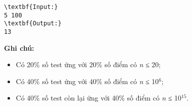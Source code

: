 \begin{verbatim}
\textbf{Input:}
5 100
\textbf{Output:}
13
\end{verbatim}

\textbf{\textbf{Ghi chú:}}
\begin{itemize}
	\item Có 20\% số test ứng với 20\% số điểm có \emph{n }≤ 20;
	\item Có 40\% số test ứng với 40\% số điểm có \emph{n }≤ 10$^6$;
	\item Có 40\% số test còn lại ứng với 40\% số điểm có \emph{n }≤ 10$^15$.
\end{itemize}